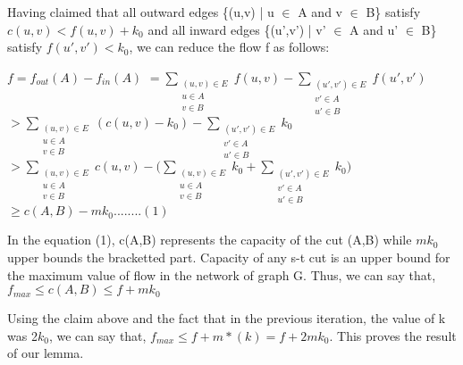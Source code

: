 \documentclass{article}
\begin{document}
\begin{mdframed}
Having claimed that all outward edges \{(u,v) | u $\in$ A and v $\in$ B\}  satisfy $c(u,v) < f(u,v) + k_0$ and all inward edges \{(u',v') | v' $\in$ A and u' $\in$ B\}  satisfy $ f(u',v') < k_0$, we can reduce the flow f as follows:
\begin{center}
$f = f_{out}(A) - f_{in}(A)$
$ = \sum\limits_{\substack{(u,v) \in E\\ u \in A\\ v \in B}} f(u,v) - \sum\limits_{\substack{(u',v') \in E\\ v' \in A\\ u' \in B}} f(u',v')$
\vspace{2mm}\\
$ > \sum\limits_{\substack{(u,v) \in E\\ u \in A\\ v \in B}} (c(u,v)-k_0) - \sum\limits_{\substack{(u',v') \in E\\ v' \in A\\ u' \in B}} k_0$
\vspace{2mm}\\
$ > \sum\limits_{\substack{(u,v) \in E\\ u \in A\\ v \in B}} c(u,v) - \Bigg( \sum\limits_{\substack{(u,v) \in E\\ u \in A\\ v \in B}} k_0 + \sum\limits_{\substack{(u',v') \in E\\ v' \in A\\ u' \in B}} k_0 \Bigg)$
\vspace{2mm}\\
$\geq c(A,B) - mk_0        ........(1)$
\vspace{2mm}\\
\end{center}

In the equation (1), c(A,B) represents the capacity of the cut (A,B) while $mk_0$ upper bounds the bracketted part. Capacity of any s-t cut is an upper bound for the maximum value of flow in the network of graph G. Thus, we can say that, $f_{max} \leq c(A,B) \leq f + mk_0$  %
\end{mdframed}

Using the claim above and the fact that in the previous iteration, the value of k was 2$k_0$, we can say that, $f_{max} \leq f + m*(k) = f + 2mk_0 $. This proves the result of our lemma. 
\end{document}
